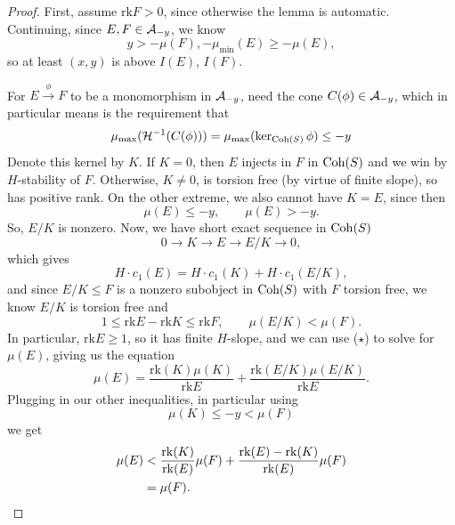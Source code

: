 \documentclass[12pt]{article}
\DeclareMathOperator{\chern}{ch}
\newcommand{\rk}{\mathrm{rk}}
\begin{document}
\begin{proof}
    First, assume $\rk F > 0$, since otherwise the lemma is automatic. Continuing, since $E,F \in \mathcal{A}_{-y}$, we know
    \[y> -\mu(F), -\mu_{\min}(E) \geq -\mu(E),\]
    so at least $(x,y)$ is above $I(E)$, $I(F)$.

    For $E\xrightarrow{\phi} F$ to be a monomorphism in $\mathcal{A}_{-y}$, need the cone $C(\phi)\in \cA_{-y}$, which in particular means is the requirement that
    \[
        \mu_{\max}(\cH^{-1}(C(\phi))) = \mu_{\max}(\ker_{\Coh(S)} \phi) \leq -y
    \]
    Denote this kernel by $K$. If $K=0$, then $E$ injects in $F$ in $\operatorname{Coh}(S)$ and we win by $H$-stability of $F$. Otherwise, $K\neq 0$, is torsion free (by virtue of finite slope), so has positive rank. On the other extreme, we also cannot have $K=E$, since then
    \[\mu(E) \leq -y, \qquad \mu(E) > -y.\] 
    So, $E/K$ is nonzero. Now, we have short exact sequence in $\operatorname{Coh}(S)$
    \[0\to K \to E \to E/K\to 0,\]
    which gives
    \[H\cdot c_1(E) = H\cdot c_1(K) + H\cdot c_1(E/K), \tag{$\star$}\]
    and since $E/K \leq F$ is a nonzero subobject in $\operatorname{Coh}(S)$ with $F$ torsion free, we know $E/K$ is torsion free and
    \[1 \leq \rk E - \rk K \leq \rk F, \qquad \mu(E/K) < \mu(F).\]
    In particular, $\rk E\geq 1$, so it has finite $H$-slope, and we can use ($\star$) to solve for $\mu(E)$, giving us the equation
    \[\mu(E) = \frac{\rk(K)\mu(K)}{\rk E} + \frac{\rk(E/K) \mu(E/K)}{\rk E}.\]
    Plugging in our other inequalities, in particular using
    \[\mu(K) \leq -y < \mu(F)\]
    we get
    \begin{align*}
        \mu(E) &< \frac{\rk(K)}{\rk(E)}\mu(F) + \frac{\rk(E) - \rk(K)}{\rk(E)}\mu(F)\\
        &= \mu(F).\qedhere
    \end{align*}

    
\end{proof}
\end{document}
